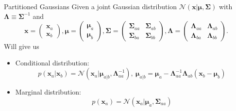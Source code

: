 \begin{frame}{\insertsubsection}

\begin{block}{Partitioned Gaussians}
Given a joint Gaussian distribution $\mathcal{N}(\mathbf{x} | \boldsymbol{\mu}, \boldsymbol{\Sigma})$ with $\boldsymbol{\Lambda} \equiv \boldsymbol{\Sigma}^{-1}$ and
\begin{equation*}
	\mathbf{x} = 
	 \begin{pmatrix}
		\mathbf{x} _{a} \\
		\mathbf{x} _{b}
	\end{pmatrix} , 
	\boldsymbol{\mu} = 
	 \begin{pmatrix}
		\boldsymbol{\mu}_{a} \\
		\boldsymbol{\mu}_{b}
	\end{pmatrix} , 
	 \boldsymbol{\Sigma} = 
	 \begin{pmatrix}
		\boldsymbol{\Sigma}_{aa} & \boldsymbol{\Sigma}_{ab} \\
		\boldsymbol{\Sigma}_{ba} & \boldsymbol{\Sigma}_{bb} 
	\end{pmatrix} ,  \boldsymbol{\Lambda} = 
	 \begin{pmatrix}
		\boldsymbol{\Lambda}_{aa} & \boldsymbol{\Lambda}_{ab} \\
		\boldsymbol{\Lambda}_{ba} & \boldsymbol{\Lambda}_{bb} 
	\end{pmatrix}.
\end{equation*}
Will give us \\
\begin{itemize}
\item \textcolor{UniGold}{Conditional distribution:}
\begin{equation*}
p\left( \mathbf{x}_a | \mathbf{x}_b \right) = \mathcal{N}\left( \mathbf{x}_a| \boldsymbol{\mu}_{a|b}, \boldsymbol{\Lambda}^{-1}_{aa} \right), \  \boldsymbol{\mu}_{a|b} =  \boldsymbol{\mu}_a - \boldsymbol{\Lambda}^{-1}_{aa}\boldsymbol{\Lambda}_{ab} \left( \mathbf{x}_b - \boldsymbol{\mu}_b \right)
\end{equation*}

\item \textcolor{UniGold}{Marginal distribution:}
\begin{equation*}
p\left( \mathbf{x}_a \right) = \mathcal{N} \left( \mathbf{x}_a | \boldsymbol{\mu}_a,\boldsymbol{\Sigma}_{aa} \right)
\end{equation*}
\end{itemize}

\end{block}
\end{frame}

